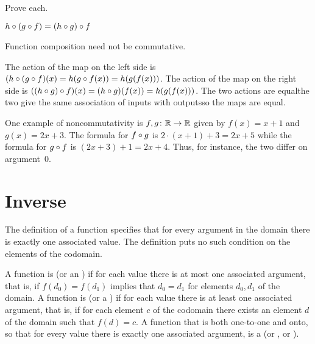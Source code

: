 \documentclass{test}  %
\begin{document}
\begin{ex} Prove each.
\begin{exes}
\item{} 
  $h\mathbin{\circ} (g\mathbin{\circ} f)=(h\mathbin{\circ} g)\mathbin{\circ} f$    
\item Function composition need not be commutative.
\end{exes}
\begin{ans}
\begin{exes}
\item The action of the map on the left side
  is $(h\mathbin{\circ} (g\mathbin{\circ} f)(x)=h(g\mathbin{\circ} f(x))
       =h(g(f(x)))$.
  The action of the map on the right side  
  is $((h\mathbin{\circ} g)\mathbin{\circ} f)(x)=(h\mathbin{\circ} g)(f(x))
      =h(g(f(x)))$.
  The two actions are equal\Dash the two give the same association of inputs
  with outputs\Dash so the maps are equal.
\item One example of noncommutativity is $\mbox{$f,g\colon \mathbb{R}\to \mathbb{R}$}$ given by 
  $f(x)=x+1$ and $g(x)=2x+3$.
  The formula for $f\mathbin{\circ} g$ is $2\cdot(x+1)+3=2x+5$ while
  the formula for $g\mathbin{\circ} f$ is $(2x+3)+1=2x+4$.
  Thus, for instance, the two differ on argument~$0$.
\end{exes}
\end{ans}
\end{ex}





\section{Inverse}

The definition of a function specifies that for every argument in the
domain there is 
exactly one associated value.
The definition puts no such condition on the elements of the codomain.

\begin{df}
A function is  (or an ) 
if for each value there is at most
one associated argument, that is, if $f(d_0)=f(d_1)$ implies that $d_0=d_1$
for elements $d_0,d_1$ of the domain.
A function is  (or a ) 
if for each value there is at least
one associated argument, that is, if for each element $c$ of the codomain
there exists an element $d$ of the domain such that $f(d)=c$.
A function that is both one-to-one and onto, so that for every value there
is exactly one associated argument, is a 
 (or , or ).
\end{df}
\end{document}
